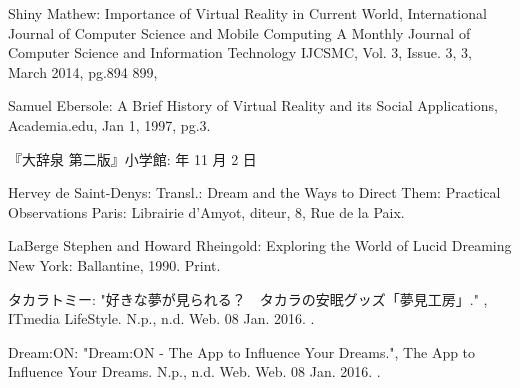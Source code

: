\begin{bib}[100]



\begin{flushleft}
  Shiny Mathew:
  \newblock Importance of Virtual Reality in Current World,
  \newblock International Journal of Computer Science and Mobile Computing A Monthly Journal of Computer Science and Information Technology IJCSMC, Vol. 3, Issue. 3, 3, March 2014, pg.894  899,
\end{flushleft}

\begin{flushleft}
  Samuel Ebersole:
  \newblock A Brief History of Virtual Reality and its Social Applications, Academia.edu,
  \newblock Jan 1, 1997,  pg.3.
\end{flushleft}

\begin{flushleft}
『大辞泉 第二版』小学館:
   年 11 月 2 日
 \end{flushleft}

\begin{flushleft}
Hervey de Saint-Denys:
  \newblock Transl.: Dream and the Ways to Direct Them: Practical Observations
  \newblock Paris: Librairie d'Amyot, diteur, 8, Rue de la Paix.
 \end{flushleft}
 
\begin{flushleft}
 LaBerge Stephen and Howard Rheingold:
  \newblock Exploring the World of Lucid Dreaming
  \newblock New York: Ballantine, 1990. Print.
 \end{flushleft}
  
\begin{flushleft}
  タカラトミー:
  \newblock "好きな夢が見られる？　タカラの安眠グッズ「夢見工房」." ,
  \newblock ITmedia LifeStyle. N.p., n.d.
  \newblock Web. 08 Jan. 2016.
  .
\end{flushleft}

\begin{flushleft}
  Dream:ON:
  \newblock "Dream:ON - The App to Influence Your Dreams.",
  \newblock The App to Influence Your Dreams. N.p., n.d. Web.
  \newblock Web. 08 Jan. 2016.
  .
\end{flushleft}


\end{bib}

